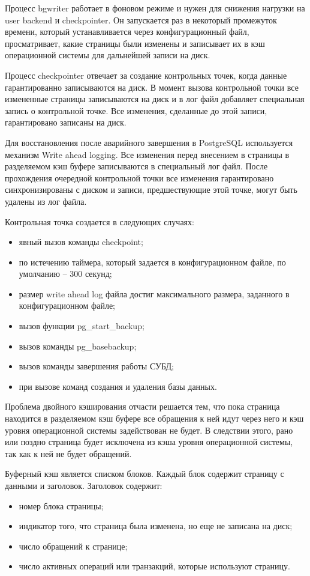Процесс bgwriter работает в фоновом режиме и нужен для снижения нагрузки на user backend и checkpointer.
Он запускается раз в некоторый промежуток времени, который устанавливается через конфигурационный файл, просматривает, какие страницы были изменены и записывает их в кэш операционной системы для дальнейшей записи на диск.

Процесс checkpointer отвечает за создание контрольных точек, когда данные гарантированно записываются на диск.
В момент вызова контрольной точки все измененные страницы записываются на диск и в лог файл добавляет специальная запись о контрольной точке.
Все изменения, сделанные до этой записи, гарантировано записаны на диск.

Для восстановления после аварийного завершения в PostgreSQL используется механизм Write ahead logging.
Все изменения перед внесением в страницы в разделяемом кэш буфере записываются в специальный лог файл.
После прохождения очередной контрольной точки все изменения гарантировано синхронизированы с диском и записи, предшествующие этой точке, могут быть удалены из лог файла.

Контрольная точка создается в следующих случаях:
\begin{itemize}
	\item явный вызов команды checkpoint;
	\item по истечению таймера, который задается в конфигурационном файле, по умолчанию -- 300 секунд;
	\item размер write ahead log файла достиг максимального размера, заданного в конфигурационном файле;
	\item вызов функции pg\_start\_backup;
	\item вызов команды pg\_basebackup;
	\item вызов команды завершения работы СУБД;
	\item при вызове команд создания и удаления базы данных.
\end{itemize}

Проблема двойного кэширования отчасти решается тем, что пока страница находится в разделяемом кэш буфере все обращения к ней идут через него и кэш уровня операционной системы задействован не будет.
В следствии этого, рано или поздно страница будет исключена из кэша уровня операционной системы, так как к ней не будет обращений.

Буферный кэш является списком блоков.
Каждый блок содержит страницу с данными и заголовок.
Заголовок содержит:
\begin{itemize}
	\item номер блока страницы;
	\item индикатор того, что страница была изменена, но еще не записана на диск;
	\item число обращений к странице;
	\item число активных операций или транзакций, которые используют страницу. 
\end{itemize}

